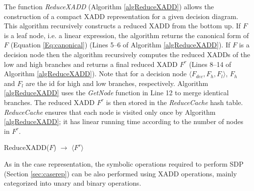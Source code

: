 \documentclass[twoside,11pt]{article}
\begin{document}
The function \emph{ReduceXADD} (Algorithm \ref{algReduceXADD}) allows the construction of a compact XADD representation for a given decision diagram. This algorithm recursively constructs a reduced XADD from the bottom up. 
If $F$ is a leaf node, i.e. a linear expression, the algorithm returns the canonical form of $F$ (Equation \ref{Eq:canonical}) (Lines 5--6 of Algorithm \ref{algReduceXADD}).  If $F$ is a decision node then the algorithm recursively computes the reduced XADDs of the low and high branches and returns a final reduced XADD $F^r$ (Lines 8--14 of Algorithm \ref{algReduceXADD}).
Note that for a decision node $\langle F_{\mathit{dec}}, F_h, F_l \rangle$, $F_h$ and $F_l$ are the id for high and low branches, respectively. 
Algorithm \ref{algReduceXADD} uses the \emph{GetNode} function in Line 12 to merge identical branches. 
The reduced XADD $F^r$ is then stored in the \emph{ReduceCache} hash table. \emph{ReduceCache} ensures that each node is visited only once by Algorithm \ref{algReduceXADD}; it has linear running time according to the number of nodes in $F^r$.
\incmargin{.5em}
\linesnumbered
\begin{algorithm}[t!]
\dontprintsemicolon
{}
\caption{{\sc ReduceXADD}($F$) $\longrightarrow$ $\langle F^r \rangle$ \label{algReduceXADD}}
\end{algorithm}
\decmargin{.5em}
As in the case representation, the symbolic operations required to perform SDP (Section \ref{sec:caserep})  can be also performed using XADD operations, mainly categorized into unary and binary operations.   
\end{document}
